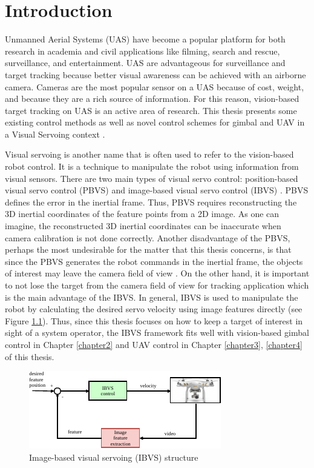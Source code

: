 \chapter{Introduction}

Unmanned Aerial Systems (UAS) have become a popular platform for both research in academia and civil applications like filming, search and rescue, surveillance, and entertainment. UAS are advantageous for surveillance and target tracking because better visual awareness can be achieved with an airborne camera. Cameras are the most popular sensor on a UAS because of cost, weight, and because they are a rich source of information. For this reason, vision-based target tracking on UAS is an active area of research. This thesis presents some existing control methods as well as novel control schemes for gimbal and UAV in a Visual Servoing context \cite{Hutchinson1996}. 

Visual servoing is another name that is often used to refer to the vision-based robot control. It is a technique to manipulate the robot using information from visual sensors. There are two main types of visual servo control: position-based visual servo control (PBVS) and image-based visual servo control (IBVS) \cite{Chaumette2006}. PBVS defines the error in the inertial frame. Thus, PBVS requires reconstructing the 3D inertial coordinates of the feature points from a 2D image. As one can imagine, the reconstructed 3D inertial coordinates can be inaccurate when camera calibration is not done correctly. Another disadvantage of the PBVS, perhaps the most undesirable for the matter that this thesis concerns, is that since the PBVS generates the robot commands in the inertial frame, the objects of interest may leave the camera field of view \cite{Hu2009}. On the other hand, it is important to not lose the target from the camera field of view for tracking application which is the main advantage of the IBVS. In general, IBVS is used to manipulate the robot by calculating the desired servo velocity using image features directly (see Figure \ref{ibvs}). Thus, since this thesis focuses on how to keep a target of interest in sight of a system operator, the IBVS framework fits well with vision-based gimbal control in Chapter \ref{chapter2} and UAV control in Chapter \ref{chapter3}, \ref{chapter4} of this thesis. 

\begin{figure}[htbp]
	\centering
	\includegraphics[width = 0.5\textheight]{images/ibvs}
	\caption{Image-based visual servoing (IBVS) structure}
	\label{ibvs}
\end{figure}

